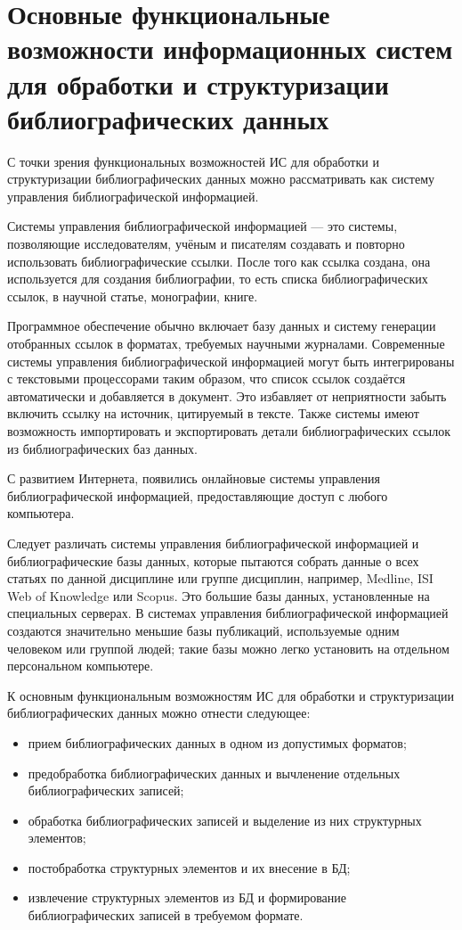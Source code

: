 \section{Основные функциональные возможности информационных систем для обработки и структуризации библиографических данных}

С точки зрения функциональных возможностей ИС для обработки и структуризации библиографических данных можно рассматривать как систему управления библиографической информацией.

Системы управления библиографической информацией — это системы, позволяющие исследователям, учёным и писателям создавать и повторно использовать библиографические ссылки. После того как ссылка создана, она используется для создания библиографии, то есть списка библиографических ссылок, в научной статье, монографии, книге.

Программное обеспечение обычно включает базу данных и систему генерации отобранных ссылок в форматах, требуемых научными журналами. Современные системы управления библиографической информацией могут быть интегрированы с текстовыми процессорами таким образом, что список ссылок создаётся автоматически и добавляется в документ. Это избавляет от неприятности забыть включить ссылку на источник, цитируемый в тексте. Также системы имеют возможность импортировать и экспортировать детали библиографических ссылок из библиографических баз данных.

С развитием Интернета, появились онлайновые системы управления библиографической информацией, предоставляющие доступ с любого компьютера.

Следует различать системы управления библиографической информацией и библиографические базы данных, которые пытаются собрать данные о всех статьях по данной дисциплине или группе дисциплин, например, Medline, ISI Web of Knowledge или Scopus. Это большие базы данных, установленные на специальных серверах. В системах управления библиографической информацией создаются значительно меньшие базы публикаций, используемые одним человеком или группой людей; такие базы можно легко установить на отдельном персональном компьютере.

К основным функциональным возможностям ИС для обработки и структуризации библиографических данных можно отнести следующее:
\begin{itemize}
	\item прием библиографических данных в одном из допустимых форматов;
	\item предобработка библиографических данных и вычленение отдельных библиографических записей;
	\item обработка библиографических записей и выделение из них структурных элементов;
	\item постобработка структурных элементов и их внесение в БД;
	\item извлечение структурных элементов из БД и формирование библиографических записей в требуемом формате.
\end{itemize}

